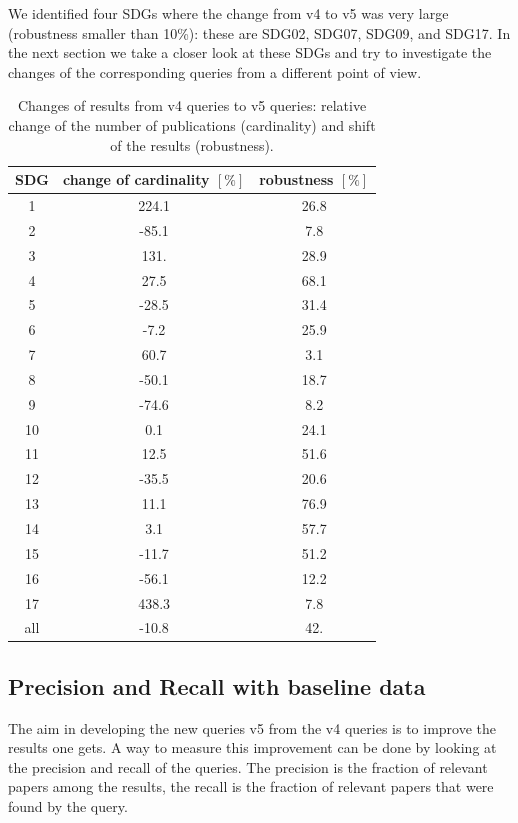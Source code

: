 \documentclass{article}
\begin{document}
We identified four SDGs where the change from v4 to v5 was very large (robustness smaller than 10\%): these are SDG02, SDG07, SDG09, and SDG17. In the next section we take a closer look at these SDGs and try to investigate the changes of the corresponding queries from a different point of view.
\begin{table}[H]
\centering 
 \begin{tabular}{ccc}
 \toprule
  SDG & change of cardinality $[\%]$  & robustness $[\%]$ \\
 \hline
 1 & 224.1 & 26.8 \\
 2 & -85.1 & 7.8 \\
 3 & 131. & 28.9 \\
 4 & 27.5 & 68.1 \\
 5 & -28.5 & 31.4 \\
 6 & -7.2 & 25.9 \\
 7 & 60.7 & 3.1 \\
 8 & -50.1 & 18.7 \\
 9 & -74.6 & 8.2 \\
 10 & 0.1 & 24.1 \\
 11 & 12.5 & 51.6 \\
 12 & -35.5 & 20.6 \\
 13 & 11.1 & 76.9 \\
 14 & 3.1 & 57.7 \\
 15 & -11.7 & 51.2 \\
 16 & -56.1 & 12.2 \\
 17 & 438.3 & 7.8 \\
 all & -10.8 & 42. \\
 \bottomrule
\end{tabular}\caption{Changes of results from v4 queries to v5 queries: relative change of the number of publications (cardinality) and shift of the results (robustness).}
\label{robustnesstable}
\end{table}



\subsection{Precision and Recall with baseline data}
\label{sec:precision-recall}
The aim in developing the new queries v5 from the v4 queries is to improve the results one gets. A way to measure this improvement can be done by looking at the precision and recall of the queries. The precision is the fraction of relevant papers among the results, the recall is the fraction of relevant papers that were found by the query.
\end{document}
